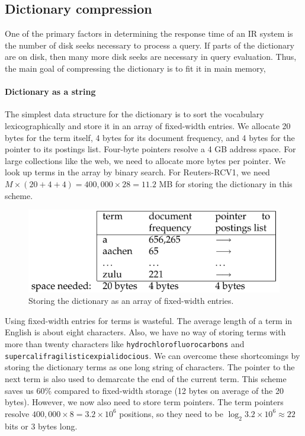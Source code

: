 \documentclass[letterpaper,11pt]{article}
\newcommand{\code}[1]{\texttt{#1}}
\begin{document}
\subsection{Dictionary compression}
One of the primary factors in determining the response time of an IR system is the number of disk seeks necessary to process a query. If parts of the dictionary are on disk, then many more disk seeks are necessary in query evaluation. Thus, the main goal of compressing the dictionary is to fit it in main memory, 

\paragraph{Dictionary as a string}
The simplest data structure for the dictionary is to sort the vocabulary lexicographically and store it in an array of fixed-width entries. We allocate 20 bytes for the term itself, 4 bytes for its document frequency, and 4 bytes for the pointer to its postings list. Four-byte pointers resolve a 4 GB address space. For large collections like the web, we need to allocate more bytes per pointer. We look up terms in the array by binary search. For Reuters-RCV1, we need $M \times (20 + 4 + 4) = 400,000\times28 = 11.2$ MB for storing the dictionary in this scheme.
\begin{figure}[H]
    \centering
    \includegraphics[scale=0.60]{sect5/figure_5_3.png}
    \caption{Storing the dictionary as an array of fixed-width entries.}
\end{figure}

Using fixed-width entries for terms is wasteful. The average length of a term in English is about eight characters. Also, we have no way of storing terms with more than twenty characters like \code{hydrochlorofluorocarbons} and \code{supercalifragilisticexpialidocious}. We can overcome these shortcomings by storing the dictionary terms as one long string of characters. The pointer to the next term is also used to demarcate the end of the current term. This scheme saves us 60\% compared to fixed-width storage (12 bytes on average of the 20 bytes). However, we now also need to store term pointers. The term pointers resolve $400,000 \times 8 = 3.2\times10^6$ positions, so they need to be $\log_2 3.2 × 10^6\approx22$ bits or 3 bytes long.
\end{document}
